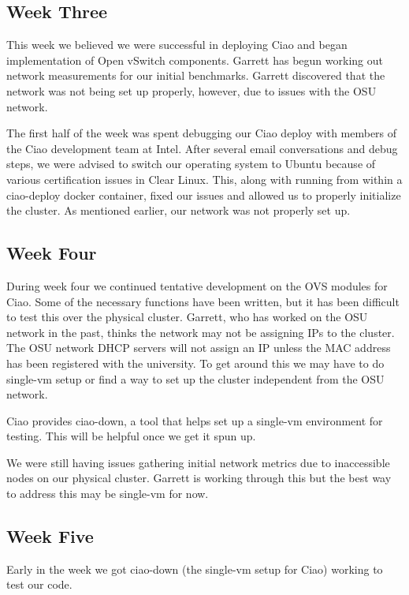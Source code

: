 \documentclass[10pt,onecolumn,journal,draftclsnofoot]{IEEEtran}
\begin{document}
\subsection{Week Three}

This week we believed we were successful in deploying Ciao and began
implementation of Open vSwitch components. Garrett has begun working out network
measurements for our initial benchmarks. Garrett discovered that the network was
not being set up properly, however, due to issues with the OSU network.

The first half of the week was spent debugging our Ciao deploy with members of
the Ciao development team at Intel. After several email conversations and debug
steps, we were advised to switch our operating system to Ubuntu because of
various certification issues in Clear Linux. This, along with running from
within a ciao-deploy docker container, fixed our issues and allowed us to
properly initialize the cluster. As mentioned earlier, our network was not
properly set up.

\subsection{Week Four}

During week four we continued tentative development on the OVS modules for Ciao.
Some of the necessary functions have been written, but it has been difficult to
test this over the physical cluster. Garrett, who has worked on the OSU network
in the past, thinks the network may not be assigning IPs to the cluster. The OSU
network DHCP servers will not assign an IP unless the MAC address has been
registered with the university. To get around this we may have to do single-vm
setup or find a way to set up the cluster independent from the OSU network.

Ciao provides ciao-down, a tool that helps set up a single-vm environment for
testing. This will be helpful once we get it spun up.

We were still having issues gathering initial network metrics due to
inaccessible nodes on our physical cluster. Garrett is working through this but
the best way to address this may be single-vm for now.

\subsection{Week Five}

Early in the week we got ciao-down (the single-vm setup for Ciao) working to
test our code.
\end{document}
